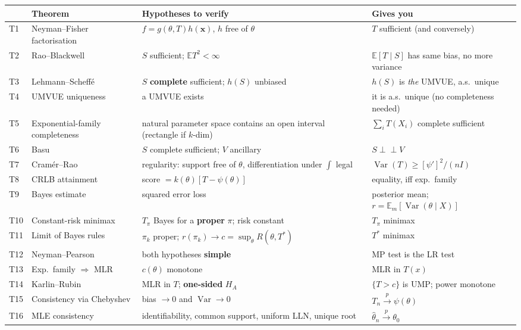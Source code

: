 \documentclass[11pt]{article}
\newcommand{\E}{\mathbb{E}}
\newcommand{\Var}{\operatorname{Var}}
\newcommand{\pto}{\overset{p}{\longrightarrow}}
\newcommand{\ind}{\perp\!\!\!\perp}
\begin{document}
\renewcommand{\arraystretch}{1.35}
\begin{longtable}{@{}p{0.7cm}p{3.5cm}p{5.6cm}p{5.4cm}@{}}
\toprule
& \textbf{Theorem} & \textbf{Hypotheses to verify} & \textbf{Gives you} \\
\midrule
\endhead
T1 & Neyman--Fisher factorisation & $f=g(\theta,T)h(\mathbf x)$, $h$ free of $\theta$ &
$T$ sufficient (and conversely) \\
T2 & Rao--Blackwell & $S$ sufficient; $\E T^2<\infty$ &
$\E[T\mid S]$ has same bias, no more variance \\
T3 & Lehmann--Scheff\'e & $S$ \textbf{complete} sufficient; $h(S)$ unbiased &
$h(S)$ is \emph{the} UMVUE, a.s.\ unique \\
T4 & UMVUE uniqueness & a UMVUE exists & it is a.s.\ unique (no completeness needed) \\
T5 & Exponential-family completeness & natural parameter space contains an open interval
(rectangle if $k$-dim) & $\sum_iT(X_i)$ complete sufficient \\
T6 & Basu & $S$ complete sufficient; $V$ ancillary & $S\ind V$ \\
T7 & Cram\'er--Rao & regularity: support free of $\theta$, differentiation under $\int$ legal &
$\Var(T)\ge[\psi']^2/(nI)$ \\
T8 & CRLB attainment & score $=k(\theta)[T-\psi(\theta)]$ & equality, iff exp.\ family \\
T9 & Bayes estimate & squared error loss & posterior mean; $r=\E_m[\Var(\theta\mid X)]$ \\
T10 & Constant-risk minimax & $T_\pi$ Bayes for a \textbf{proper} $\pi$; risk constant &
$T_\pi$ minimax \\
T11 & Limit of Bayes rules & $\pi_k$ proper; $r(\pi_k)\to c=\sup_\theta R(\theta,T^*)$ &
$T^*$ minimax \\
T12 & Neyman--Pearson & both hypotheses \textbf{simple} & MP test is the LR test \\
T13 & Exp.\ family $\Rightarrow$ MLR & $c(\theta)$ monotone & MLR in $T(x)$ \\
T14 & Karlin--Rubin & MLR in $T$; \textbf{one-sided} $H_A$ & $\{T>c\}$ is UMP; power monotone \\
T15 & Consistency via Chebyshev & bias $\to0$ and $\Var\to0$ & $T_n\pto\psi(\theta)$ \\
T16 & MLE consistency & identifiability, common support, uniform LLN, unique root &
$\hat\theta_n\pto\theta_0$ \\
\bottomrule
\end{longtable}
\end{document}
